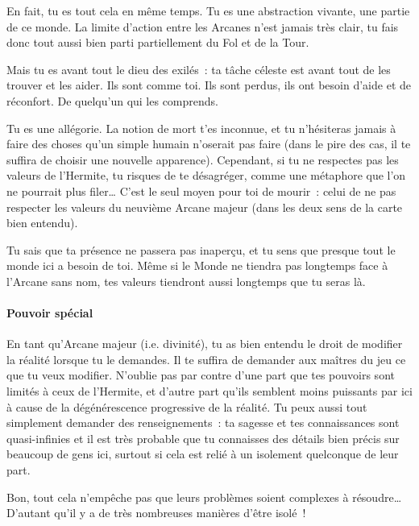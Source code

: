 {{En fait, tu es tout cela en même temps.
Tu es une abstraction vivante, une partie de ce monde.
La limite d’action entre les Arcanes n’est jamais très clair, tu fais donc tout aussi bien parti partiellement du Fol et de la Tour.

Mais tu es avant tout le dieu des exilés~:  ta tâche céleste est avant tout de les trouver et les aider.
Ils sont comme toi.  Ils sont perdus, ils ont besoin d’aide et de réconfort.
De quelqu’un qui les comprends.

Tu es une allégorie.
La notion de mort t’es inconnue, et tu n’hésiteras jamais à faire des choses qu’un simple humain n’oserait pas faire (dans le pire des cas, il te suffira de choisir une nouvelle apparence).
Cependant, si tu ne respectes pas les valeurs de l’Hermite, tu risques de te désagréger, comme une métaphore que l’on ne pourrait plus filer…
C’est le seul moyen pour toi de mourir~:  celui de ne pas respecter les valeurs du neuvième Arcane majeur (dans les deux sens de la carte bien entendu).

Tu sais que ta présence ne passera pas inaperçu, et tu sens que presque tout le monde ici a besoin de toi.
Même si le Monde ne tiendra pas longtemps face à l’Arcane sans nom, tes valeurs tiendront aussi longtemps que tu seras là.
}


\paragraph{Pouvoir spécial}{
En tant qu’Arcane majeur (i.e. divinité), tu as bien entendu le droit de modifier la réalité lorsque tu le demandes.
Il te suffira de demander aux maîtres du jeu ce que tu veux modifier.
N’oublie pas par contre d’une part que tes pouvoirs sont limités à ceux de l’Hermite, et d’autre part qu’ils semblent moins puissants par ici à cause de la dégénérescence progressive de la réalité.
Tu peux aussi tout simplement demander des renseignements~:  ta sagesse et tes connaissances sont quasi-infinies et il est très probable que tu connaisses des détails bien précis sur beaucoup de gens ici, surtout si cela est relié à un isolement quelconque de leur part.

Bon, tout cela n’empêche pas que leurs problèmes soient complexes à résoudre…  D’autant qu’il y a de très nombreuses manières d’être isolé~!
}
}


